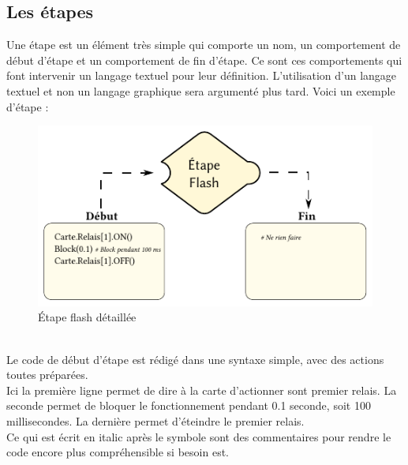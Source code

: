 \subsection{Les étapes}
Une étape est un élément très simple qui comporte un nom, un comportement de début d'étape et un comportement de fin d'étape.
Ce sont ces comportements qui font intervenir un langage textuel pour leur définition. L'utilisation d'un langage textuel et non un langage graphique sera argumenté plus tard.
\newpage
Voici un exemple d'étape :
\begin{figure}[htbp]
  \centering
  \includegraphics[width=.85\textwidth]{figs/etape_seule.pdf}
  \caption{Étape flash détaillée}
  \label{fig:etape_seule}
\end{figure} ~\\
Le code de début d'étape est rédigé dans une syntaxe simple, avec des actions toutes préparées. \\
Ici la première ligne permet de dire à la carte d'actionner sont premier relais. La seconde permet de bloquer le fonctionnement pendant 0.1 seconde, soit 100 millisecondes. La dernière permet d'éteindre le premier relais. \\
Ce qui est écrit en italic après le symbole \up{\textbf{\tiny \#}} sont des commentaires pour rendre le code encore plus compréhensible si besoin est.

